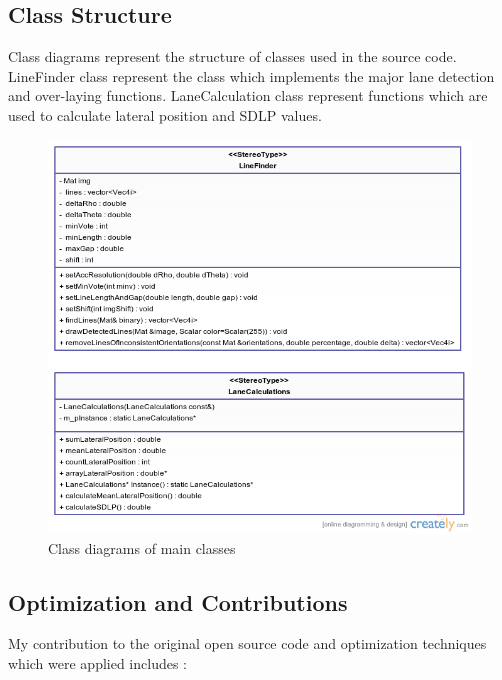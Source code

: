 \subsection{Class Structure}

Class diagrams represent the structure of classes used in the source code. LineFinder class represent the class which implements the major lane detection and over-laying functions. LaneCalculation class represent functions which are used to calculate lateral position and SDLP values.

\begin{figure}[H]
\begin{center}
    \includegraphics[scale=0.6]{img/lane14.png}
\end{center}
\caption{Class diagrams of main classes}
\end{figure}

\subsection{Optimization and Contributions}

My contribution to the original open source code and optimization techniques which were applied includes :

